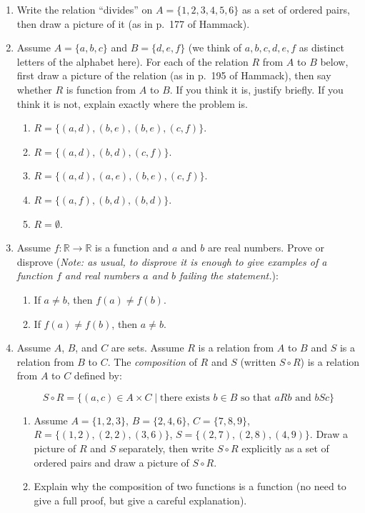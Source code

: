 \documentclass{amsart}
\theoremstyle{definition}
\begin{document}
\begin{enumerate}
\item Write the relation ``divides'' on $A = \{1,2,3,4,5,6\}$ as a set of ordered pairs, then draw a picture of it (as in p.~177 of Hammack).
\item Assume $A = \{a, b, c\}$ and $B = \{d, e, f\}$ (we think of $a, b, c, d, e, f$ as distinct letters of the alphabet here). For each of the relation $R$ from $A$ to $B$ below, first draw a picture of the relation (as in p.~195 of Hammack), then say whether $R$ is function from $A$ to $B$. If you think it is,  justify briefly. If you think it is not, explain exactly where the problem is.

  \begin{enumerate}
  \item $R = \{(a, d), (b, e), (b, e), (c, f)\}$.
  \item $R = \{(a, d), (b, d), (c, f)\}$.
  \item $R = \{(a, d), (a, e), (b, e), (c, f)\}$.
  \item $R = \{(a, f), (b, d), (b, d)\}$.
  \item $R = \emptyset$.
  \end{enumerate}
\item Assume $f: \mathbb{R} \to \mathbb{R}$ is a function and $a$ and $b$ are real numbers. Prove or disprove (\emph{Note: as usual, to disprove it is enough to give examples of a function $f$ and real numbers $a$ and $b$ failing the statement.}):
  \begin{enumerate}
  \item If $a \neq b$, then $f (a) \neq f (b)$.
  \item If $f(a) \neq f (b)$, then $a \neq b$.
  \end{enumerate}
\item Assume $A$, $B$, and $C$ are sets. Assume $R$ is a relation from $A$ to $B$ and $S$ is a relation from $B$ to $C$. The \emph{composition} of $R$ and $S$ (written $S \circ R$) is a relation from $A$ to $C$ defined by:

  $$
  S \circ R = \{(a, c) \in A \times C \mid \text{there exists } b \in B \text{ so that } a R b \text{ and } b S c\}
  $$

  \begin{enumerate}
  \item Assume $A = \{1, 2, 3\}$, $B = \{2, 4, 6\}$, $C = \{7,8, 9\}$, $R = \{(1, 2), (2, 2), (3, 6)\}$, $S = \{(2, 7), (2, 8), (4,9)\}$. Draw a picture of $R$ and $S$ separately, then write $S \circ R$ explicitly as a set of ordered pairs and draw a picture of $S \circ R$.
  \item Explain why the composition of two functions is a function (no need to give a full proof, but give a careful explanation).
  \end{enumerate}


\end{enumerate}
\end{document}
